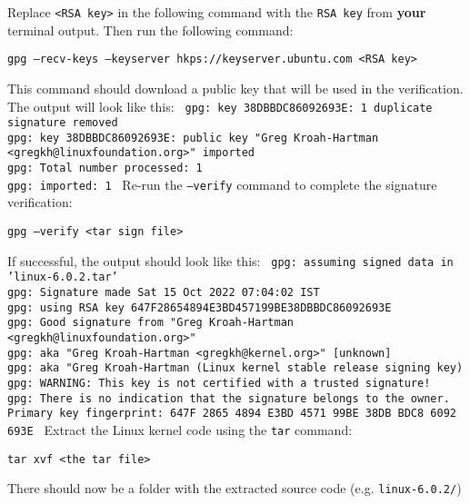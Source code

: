 \documentclass[12pt,a4paper]{report}
\begin{document}
\newline
\newline
Replace \texttt{<RSA key>} in the following command with the \texttt{RSA key} from \textbf{your} terminal output. Then run the following command:
\newline
\newline
\centerline{\texttt{\small gpg --recv-keys --keyserver hkps://keyserver.ubuntu.com <RSA key>}}
\newline
\newline
This command should download a public key that will be used in the verification. The output will look like this:
\newline
\newline
\texttt{\scriptsize
gpg: key 38DBBDC86092693E: 1 duplicate signature removed
\\
gpg: key 38DBBDC86092693E: public key "Greg Kroah-Hartman <gregkh@linuxfoundation.org>" imported
\\
gpg: Total number processed: 1
\\
gpg:               imported: 1
}
\newline
\newline
Re-run the \texttt{--verify} command to complete the signature verification:
\newline
\newline
\centerline{\texttt{gpg --verify <tar sign file>}}
\newline
\newline
If successful, the output should look like this:
\newline
\newline
\texttt{\footnotesize
gpg: assuming signed data in 'linux-6.0.2.tar'
\\
gpg: Signature made Sat 15 Oct 2022 07:04:02 IST
\\
gpg:                using RSA key 647F28654894E3BD457199BE38DBBDC86092693E
\\
gpg: Good signature from "Greg Kroah-Hartman <gregkh@linuxfoundation.org>"
\\
gpg:                 aka "Greg Kroah-Hartman <gregkh@kernel.org>" [unknown]
\\
gpg:                 aka "Greg Kroah-Hartman (Linux kernel stable release signing key)
\\
gpg: WARNING: This key is not certified with a trusted signature!
\\
gpg:          There is no indication that the signature belongs to the owner.
\\
Primary key fingerprint: 647F 2865 4894 E3BD 4571  99BE 38DB BDC8 6092 693E
}
\newline
\newline
Extract the Linux kernel code using the \texttt{tar} command:
\newline
\newline
\centerline{\texttt{tar xvf <the tar file>}}
\newline
\newline
There should now be a folder with the extracted source code (e.g. \texttt{linux-6.0.2/}) 
\end{document}
